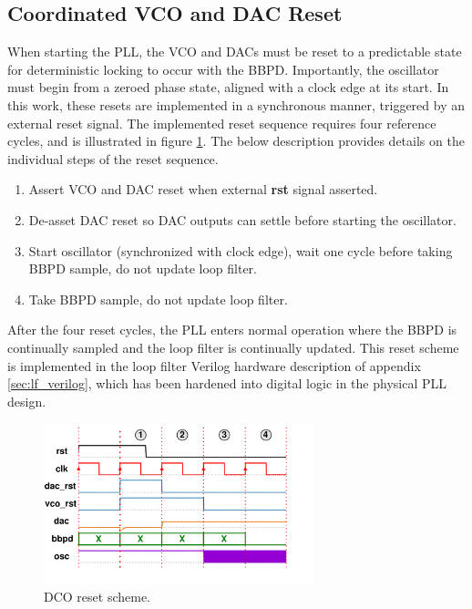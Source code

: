 	\subsection{Coordinated VCO and DAC Reset}
	When starting the PLL, the VCO and DACs must be reset to a predictable state for deterministic locking to occur with the BBPD. Importantly, the oscillator must begin from a zeroed phase state, aligned with a clock edge at its start. In this work, these resets are implemented in a synchronous manner, triggered by an external reset signal. The implemented reset sequence requires four reference cycles, and is illustrated in figure \ref{fig:dco_dac_rst}. The below description provides details on the individual steps of the reset sequence.
\begin{enumerate}[itemsep=0pt,label=\protect\mycirc{\arabic*}]
	\setlength\itemsep{-0.8em}
	\item Assert VCO and DAC reset when external \textbf{rst} signal asserted.
	\item De-asset DAC reset so DAC outputs can settle before starting the oscillator. 
	\item Start oscillator (synchronized with clock edge), wait one cycle before taking BBPD sample, do not update loop filter.
	\item Take BBPD sample, do not update loop filter.
\end{enumerate}
After the four reset cycles, the PLL enters normal operation where the BBPD is continually sampled and the loop filter is continually updated. This reset scheme is implemented in the loop filter Verilog hardware description of appendix \ref{sec:lf_verilog}, which has been hardened into digital logic in the physical PLL design. 
	\begin{figure}[htb!]
	    \center\includegraphics[width=0.70\textwidth, angle=0]{figs/design/rst_vco_dac}
	    \caption{DCO reset scheme.}
	    \label{fig:dco_dac_rst}
	\end{figure}


